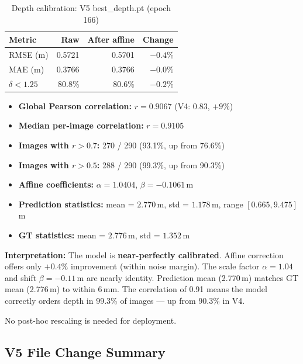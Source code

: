\documentclass[11pt,a4paper]{article}
\begin{document}
\begin{table}[h]
\centering
\caption{Depth calibration: V5 best\_depth.pt (epoch 166)}
\label{tab:vivek-v5-calibration}
\begin{tabular}{lrrr}
\toprule
\textbf{Metric} & \textbf{Raw} & \textbf{After affine} & \textbf{Change} \\
\midrule
RMSE (m)         & 0.5721 & 0.5701 & $-0.4\%$ \\
MAE (m)          & 0.3766 & 0.3766 & $-0.0\%$ \\
$\delta < 1.25$  & 80.8\% & 80.6\% & $-0.2\%$ \\
\bottomrule
\end{tabular}
\end{table}

\begin{itemize}[nosep]
  \item \textbf{Global Pearson correlation:} $r = 0.9067$ (V4: $0.83$, $+9\%$)
  \item \textbf{Median per-image correlation:} $r = 0.9105$
  \item \textbf{Images with $r > 0.7$:} 270 / 290 (93.1\%, up from 76.6\%)
  \item \textbf{Images with $r > 0.5$:} 288 / 290 (99.3\%, up from 90.3\%)
  \item \textbf{Affine coefficients:} $\alpha = 1.0404$, $\beta = -0.1061$\,m
  \item \textbf{Prediction statistics:} mean = $2.770$\,m, std = $1.178$\,m,
    range $[0.665, 9.475]$\,m
  \item \textbf{GT statistics:} mean = $2.776$\,m, std = $1.352$\,m
\end{itemize}

\textbf{Interpretation:} The model is \textbf{near-perfectly calibrated}.
Affine correction offers only $+0.4\%$ improvement (within noise margin).
The scale factor $\alpha = 1.04$ and shift $\beta = -0.11$\,m are nearly
identity. Prediction mean (2.770\,m) matches GT mean (2.776\,m) to within
6\,mm. The correlation of 0.91 means the model correctly orders depth in
99.3\% of images --- up from 90.3\% in V4.

No post-hoc rescaling is needed for deployment.

\subsection{V5 File Change Summary}
\label{sec:vivek-v5-files}
\end{document}
